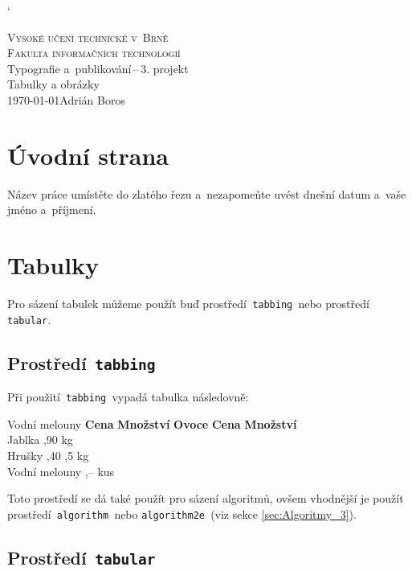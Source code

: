 \documentclass[a4paper,11pt]{article}
\begin{document}
\catcode`

\begin{titlepage}
\begin{center}
\Huge
\textsc{Vysoké učení technické v~Brně}\\
\huge
\textsc{Fakulta informačních technologií}\\
\LARGE Typografie a~publikování\,--\,3. projekt\\
\Huge Tabulky a obrázky\\
\Large
\today\hfill Adrián Boros
\end{center}
\end{titlepage}

\section{Úvodní strana}

Název práce umístěte do zlatého řezu a~nezapomeňte uvést dnešní datum a~vaše jméno a~příjmení.

\section{Tabulky}

Pro sázení tabulek můžeme použít buď prostředí\texttt{ tabbing }nebo prostředí\texttt{ tabular}.

\subsection{Prostředí\texttt{ tabbing}}

Při použití\texttt{ tabbing }vypadá tabulka následovně:
\begin{tabbing}
Vodní melouny \quad	\= \textbf{Cena} \quad \= \textbf{Množství}	\kill
\textbf{Ovoce} \> \textbf{Cena} \> \textbf{Množství} \\
Jablka ,90  kg \\
Hrušky ,40 ,5 kg \\
Vodní melouny ,--  kus \\
\end{tabbing}
Toto prostředí se dá také použít pro sázení algoritmů, ovšem vhodnější je použít 
prostředí\texttt{ algorithm }nebo \texttt{algorithm2e }(viz sekce \ref{sec:Algoritmy_3}).

\subsection{Prostředí\texttt{ tabular}}
\end{document}
